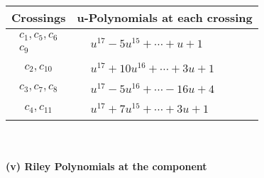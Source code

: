 \documentclass[1p]{elsarticle_modified}
\theoremstyle{definition}
\begin{document}
\begin{tabular}{m{50pt}|m{274pt}}
Crossings & \hspace{64pt}u-Polynomials at each crossing \\
\hline $$\begin{aligned}c_{1},c_{5},c_{6}\\c_{9}\end{aligned}$$&$\begin{aligned}
&u^{17}-5 u^{15}+\cdots+u+1
\end{aligned}$\\
\hline $$\begin{aligned}c_{2},c_{10}\end{aligned}$$&$\begin{aligned}
&u^{17}+10 u^{16}+\cdots+3 u+1
\end{aligned}$\\
\hline $$\begin{aligned}c_{3},c_{7},c_{8}\end{aligned}$$&$\begin{aligned}
&u^{17}-5 u^{16}+\cdots-16 u+4
\end{aligned}$\\
\hline $$\begin{aligned}c_{4},c_{11}\end{aligned}$$&$\begin{aligned}
&u^{17}+7 u^{15}+\cdots+3 u+1
\end{aligned}$\\
\hline
\end{tabular}\\~\\
\newpage\renewcommand{\arraystretch}{1}
\flushleft \textbf{(v) Riley Polynomials at the component}\newline \\
\end{document}
